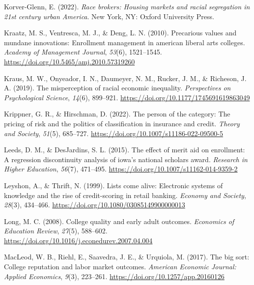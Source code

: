 \documentclass[
  12pt,
]{article}
\newlength{\cslhangindent}
\newlength{\cslentryspacingunit} %
\newenvironment{CSLReferences}[2] %
 {%
  \setlength{\parindent}{0pt}
  \ifodd #1
  \let\oldpar\par
  \def\par{\hangindent=\cslhangindent\oldpar}
  \fi
  \setlength{\parskip}{#2\cslentryspacingunit}
 }%
 {}
\begin{document}
\begin{CSLReferences}{1}{0}
\leavevmode{}%
Korver-Glenn, E. (2022). \emph{Race brokers: Housing markets and racial segregation in 21st {c}entury urban {A}merica}. New York, NY: Oxford University Press.

\leavevmode{}%
Kraatz, M. S., Ventresca, M. J., \& Deng, L. N. (2010). Precarious values and mundane innovations: Enrollment management in american liberal arts colleges. \emph{Academy of Management Journal}, \emph{53}(6), 1521--1545. \url{https://doi.org/10.5465/amj.2010.57319260}

\leavevmode{}%
Kraus, M. W., Onyeador, I. N., Daumeyer, N. M., Rucker, J. M., \& Richeson, J. A. (2019). The misperception of racial economic inequality. \emph{Perspectives on Psychological Science}, \emph{14}(6), 899--921. \url{https://doi.org/10.1177/1745691619863049}

\leavevmode{}%
Krippner, G. R., \& Hirschman, D. (2022). The person of the category: The pricing of risk and the politics of classification in insurance and credit. \emph{Theory and Society}, \emph{51}(5), 685--727. \url{https://doi.org/10.1007/s11186-022-09500-5}

\leavevmode{}%
Leeds, D. M., \& DesJardins, S. L. (2015). The effect of merit aid on enrollment: A regression discontinuity analysis of iowa's national scholars award. \emph{Research in Higher Education}, \emph{56}(7), 471--495. \url{https://doi.org/10.1007/s11162-014-9359-2}

\leavevmode{}%
Leyshon, A., \& Thrift, N. (1999). Lists come alive: Electronic systems of knowledge and the rise of credit-scoring in retail banking. \emph{Economy and Society}, \emph{28}(3), 434--466. \url{https://doi.org/10.1080/03085149900000013}

\leavevmode{}%
Long, M. C. (2008). College quality and early adult outcomes. \emph{Economics of Education Review}, \emph{27}(5), 588--602. \url{https://doi.org/10.1016/j.econedurev.2007.04.004}

\leavevmode{}%
MacLeod, W. B., Riehl, E., Saavedra, J. E., \& Urquiola, M. (2017). The big sort: College reputation and labor market outcomes. \emph{American Economic Journal: Applied Economics}, \emph{9}(3), 223--261. \url{https://doi.org/10.1257/app.20160126}


\end{CSLReferences}
\end{document}
